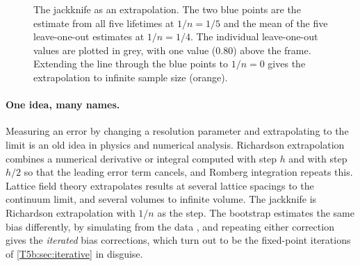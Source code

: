 \begin{figure}[htbp]
\centering
{}
\caption{The jackknife as an extrapolation. The two blue points are the estimate from all five lifetimes at $1/n=1/5$ and the mean of the five leave-one-out estimates at $1/n=1/4$. The individual leave-one-out values are plotted in grey, with one value ($0.80$) above the frame. Extending the line through the blue points to $1/n=0$ gives the extrapolation to infinite sample size (orange).}
\label{T5b:fig:jk-extrapolate}
\end{figure}

\paragraph{One idea, many names.}
Measuring an error by changing a resolution parameter and extrapolating to
the limit is an old idea in physics and numerical analysis. Richardson
extrapolation combines a numerical derivative or integral computed with
step $h$ and with step $h/2$ so that the leading error term cancels, and
Romberg integration repeats this. Lattice field theory extrapolates results
at several lattice spacings to the continuum limit, and several volumes to
infinite volume. The jackknife is Richardson extrapolation with $1/n$ as the
step. The bootstrap estimates the same bias differently, by simulating
from the data \cite{Efron1979}, and repeating either correction gives the
\emph{iterated} bias corrections, which turn out to be the fixed-point
iterations of \cref{T5b:sec:iterative} in disguise.


